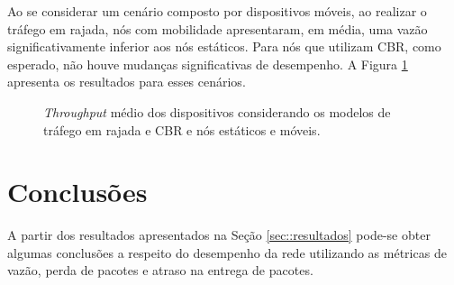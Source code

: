 \documentclass[12pt]{article}
\begin{document}
Ao se considerar um cenário composto por dispositivos móveis, ao realizar o tráfego em rajada, nós com mobilidade apresentaram, em média, uma vazão significativamente inferior aos nós estáticos. Para nós que utilizam CBR, como esperado, não houve mudanças significativas de desempenho. A Figura \ref{fig:throughput_CBR_pulse} apresenta os resultados para esses cenários. 

\begin{figure}[H]
\begin{center}
{%
\setlength{\fboxsep}{2pt}%
\setlength{\fboxrule}{1pt}%
%
}
\end{center}
\caption{\textit{Throughput} médio dos dispositivos considerando os modelos de tráfego em rajada e CBR e nós estáticos e móveis.}
\label{fig:throughput_CBR_pulse}
\end{figure}


\section{Conclusões}

A partir dos resultados apresentados na Seção \ref{sec::resultados} pode-se obter algumas conclusões a respeito do desempenho da rede utilizando as métricas de vazão, perda de pacotes e atraso na entrega de pacotes.
\end{document}
